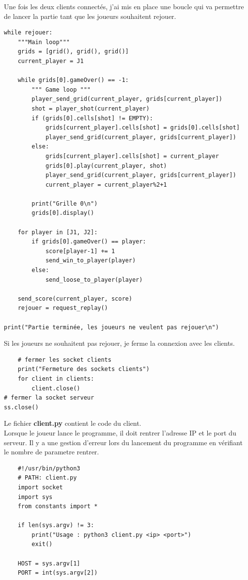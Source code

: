 \documentclass{article}
\begin{document}
Une fois les deux clients connectés, j'ai mis en place une boucle qui va permettre de lancer la partie tant que les joueurs souhaitent rejouer.\\
\begin{lstlisting}
while rejouer:
    """Main loop"""
    grids = [grid(), grid(), grid()]
    current_player = J1
    
    while grids[0].gameOver() == -1:
        """ Game loop """
        player_send_grid(current_player, grids[current_player])
        shot = player_shot(current_player)
        if (grids[0].cells[shot] != EMPTY):
            grids[current_player].cells[shot] = grids[0].cells[shot]
            player_send_grid(current_player, grids[current_player])
        else:
            grids[current_player].cells[shot] = current_player
            grids[0].play(current_player, shot)
            player_send_grid(current_player, grids[current_player])
            current_player = current_player%2+1
        
        print("Grille 0\n")
        grids[0].display()

    for player in [J1, J2]:
        if grids[0].gameOver() == player:
            score[player-1] += 1
            send_win_to_player(player)
        else:
            send_loose_to_player(player)

    send_score(current_player, score)
    rejouer = request_replay()
            
print("Partie terminée, les joueurs ne veulent pas rejouer\n")
\end{lstlisting}
Si les joueurs ne souhaitent pas rejouer, je ferme la connexion avec les clients.\\
\begin{lstlisting}
    # fermer les socket clients
    print("Fermeture des sockets clients")
    for client in clients:
        client.close()
# fermer la socket serveur
ss.close()
\end{lstlisting}
Le fichier \textbf{client.py} contient le code du client.\\
Lorsque le joueur lance le programme, il doit rentrer l'adresse IP et le port du serveur. Il y a une gestion d'erreur lors du lancement du programme en vérifiant le nombre de parametre rentrer.\\
\begin{lstlisting}
    #!/usr/bin/python3
    # PATH: client.py
    import socket
    import sys
    from constants import *

    if len(sys.argv) != 3:
        print("Usage : python3 client.py <ip> <port>")
        exit()

    HOST = sys.argv[1]
    PORT = int(sys.argv[2])
\end{lstlisting}
\end{document}
